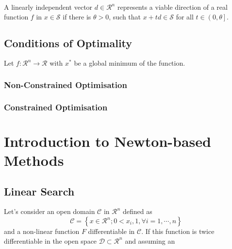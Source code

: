 \begin{defn} A linearly independent vector $d\in\mathcal{R}^{n}$ represents a viable direction of a real function $f$ in $x\in\mathcal{S}$ if there is $\theta >0$, such that $x+t d\in \mathcal{S}$ for all $t\in\left.\left(0,\theta\right.\right]$.   
\end{defn}

\subsection{Conditions of Optimality}\label{Chapter:GlobalOpt:Section:ConditionsOptimality}
Let $f:\mathcal{R}^{n}\rightarrow\mathcal{R}$ with $x^{\ast}$ be a global minimum of the function.

\subsubsection{Non-Constrained Optimisation}



\subsubsection{Constrained Optimisation}






\section{Introduction to Newton-based Methods}\label{Chapter:GlobalOpt:Section:NewtonMethods}

\subsection{Linear Search}\label{Chapter:GlobalOpt:Section:NewtonMethods:LinearSearch}

\begin{shaded}
    Let's consider an open domain $\mathcal{C}$ in $\mathcal{R}^{n}$ defined as
\begin{displaymath}
    \mathcal{C} = \left\{x\in\mathcal{R}^{n}; 0<x_{i},1, \forall i=1,\cdots,n\right\}
\end{displaymath}
and a non-linear function $F$ differentiable in $\mathcal{C}$. If this function is twice differentiable in the open space $\mathcal{D}\subset\mathcal{R}^{n}$ and assuming an 
\end{shaded}

